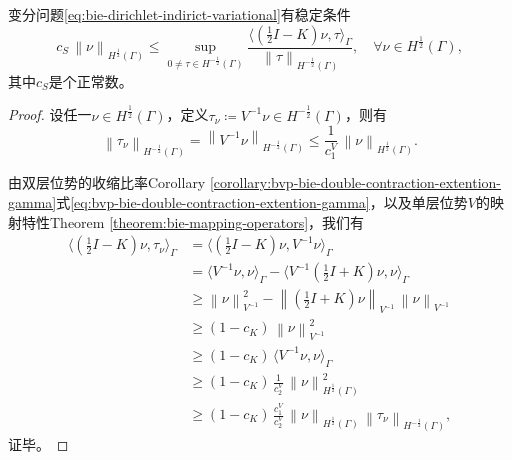 \begin{lemma}[变分问题的稳定条件]
  变分问题\eqref{eq:bie-dirichlet-indirict-variational}有稳定条件
  \begin{equation}
    \label{eq:bie-dirichlet-indirict-variational-stability}
    c_{S} \, \left\| \nu \right\|_{H^{\frac{1}{2}}(\Gamma)}
    \le \sup_{0 \neq \tau \in H^{-\frac{1}{2}}(\Gamma)}
    \frac{
    \langle \left( \frac{1}{2} I - K \right) \nu, \tau \rangle_{\Gamma}
    }{
    \left\| \tau \right\|_{H^{-\frac{1}{2}}(\Gamma)}
    }, \quad \forall \nu \in H^{\frac{1}{2}}(\Gamma),
  \end{equation}
  其中$c_{S}$是个正常数。
\end{lemma}
\begin{proof}
设任一$\nu \in H^{\frac{1}{2}}(\Gamma)$，定义$\tau_{\nu} \coloneqq V^{-1} \nu \in H^{-\frac{1}{2}}(\Gamma)$，则有
\begin{equation*}
  \left\| \tau_{\nu} \right\|_{H^{-\frac{1}{2}}(\Gamma)}
  = \left\| V^{-1} \nu \right\|_{H^{-\frac{1}{2}}(\Gamma)}
  \le \frac{1}{c_{1}^{V}} \, \left\| \nu \right\|_{H^{\frac{1}{2}}(\Gamma)}.
\end{equation*}

由双层位势的收缩比率Corollary \ref{corollary:bvp-bie-double-contraction-extention-gamma}式\eqref{eq:bvp-bie-double-contraction-extention-gamma}，以及单层位势$V$的映射特性Theorem \ref{theorem:bie-mapping-operators}，我们有
\begin{equation*}
  \begin{split}
    \langle \left( \frac{1}{2} I - K \right) \nu, \tau_{\nu} \rangle_{\Gamma}
    & = \langle \left( \frac{1}{2} I - K \right) \nu, V^{-1} \nu \rangle_{\Gamma} \\
    & = \langle V^{-1} \nu, \nu \rangle_{\Gamma}
    - \langle V^{-1} \left( \frac{1}{2} I + K \right) \nu, \nu \rangle_{\Gamma} \\
    & \ge \left\| \nu \right\|_{V^{-1}}^{2}
    - \left\| \left( \frac{1}{2} I + K \right) \nu \right\|_{V^{-1}}
    \, \left\| \nu \right\|_{V^{-1}} \\
    & \ge \left( 1 - c_{K} \right) \, \left\| \nu \right\|_{V^{-1}}^{2} \\
    & \ge \left( 1 - c_{K} \right) \,
    \langle V^{-1} \nu, \nu \rangle_{\Gamma} \\
    & \ge \left( 1 - c_{K} \right) \, \frac{1}{c_{2}^{V}} \,
    \left\| \nu \right\|_{H^{\frac{1}{2}}(\Gamma)}^{2} \\
    & \ge \left( 1 - c_{K} \right) \,  \frac{c_{1}^{V}}{c_{2}^{V}} \,
    \left\| \nu \right\|_{H^{\frac{1}{2}}(\Gamma)}
    \, \left\| \tau_{\nu} \right\|_{H^{-\frac{1}{2}}(\Gamma)},
  \end{split}
\end{equation*}
证毕。
\end{proof}

